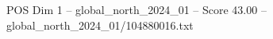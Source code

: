 \begin{textsample}{POS Dim 1 – global\_north\_2024\_01 – Score 43.00 – global\_north\_2024\_01/104880016.txt}
\end{textsample}
